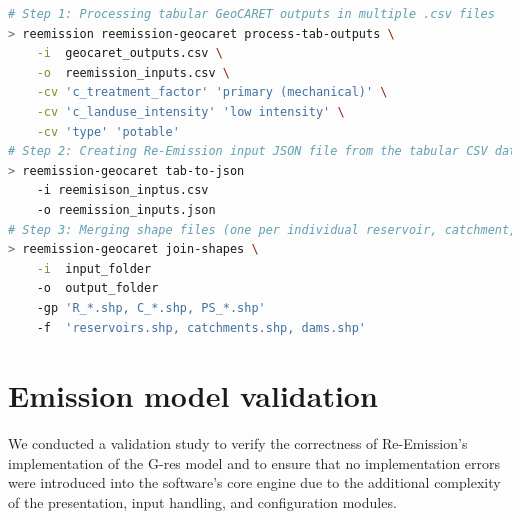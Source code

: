 \documentclass[final,1p,times]{elsarticle}
\begin{document}
\begin{minipage}{0.95\textwidth}
\begin{lstlisting}[language=bash, 
label={lst:integration_cli}, caption={Re-Emission CLI: Processing outputs from the GeoCARET reservoir and catchment processing tool.}]
# Step 1: Processing tabular GeoCARET outputs in multiple .csv files 
> reemission reemission-geocaret process-tab-outputs \
    -i  geocaret_outputs.csv \
    -o  reemission_inputs.csv \
    -cv 'c_treatment_factor' 'primary (mechanical)' \
    -cv 'c_landuse_intensity' 'low intensity' \
    -cv 'type' 'potable'
# Step 2: Creating Re-Emission input JSON file from the tabular CSV data
> reemission-geocaret tab-to-json 
    -i reemisison_inptus.csv 
    -o reemission_inputs.json
# Step 3: Merging shape files (one per individual reservoir, catchment, dam, etc.) into combined shapes per geometry type
> reemission-geocaret join-shapes \
    -i  input_folder
    -o  output_folder
    -gp 'R_*.shp, C_*.shp, PS_*.shp'
    -f  'reservoirs.shp, catchments.shp, dams.shp'
\end{lstlisting}
\end{minipage}



\section{Emission model validation}
\label{sec:validation}

We conducted a validation study to verify the correctness of Re-Emission’s implementation of the G-res model and to ensure that no implementation errors were introduced into the software’s core engine due to the additional complexity of the presentation, input handling, and configuration modules.
\end{document}

